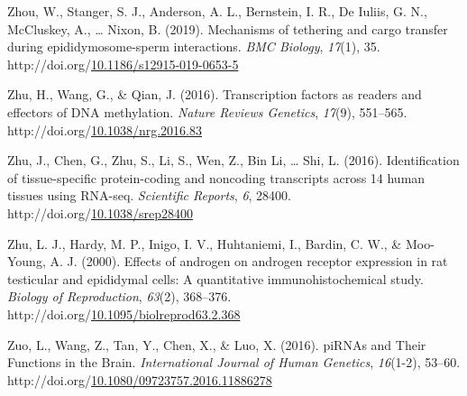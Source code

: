 \documentclass[12pt,twoside]{reedthesis}
\newlength{\cslhangindent}
\newenvironment{CSLReferences}[2] %
 {%
  \setlength{\parindent}{0pt}
  \ifodd #1 \everypar{\setlength{\hangindent}{\cslhangindent}}\ignorespaces\fi
  \ifnum #2 > 0
  \setlength{\parskip}{#2\baselineskip}
  \fi
 }%
 {}
\begin{document}
\begin{CSLReferences}{1}{0}
\leavevmode{}%
Zhou, W., Stanger, S. J., Anderson, A. L., Bernstein, I. R., De Iuliis, G. N., McCluskey, A., \ldots{} Nixon, B. (2019). Mechanisms of tethering and cargo transfer during epididymosome-sperm interactions. \emph{{BMC} Biology}, \emph{17}(1), 35. http://doi.org/\href{https://doi.org/10.1186/s12915-019-0653-5}{10.1186/s12915-019-0653-5}

\leavevmode{}%
Zhu, H., Wang, G., \& Qian, J. (2016). Transcription factors as readers and effectors of DNA methylation. \emph{Nature Reviews Genetics}, \emph{17}(9), 551--565. http://doi.org/\href{https://doi.org/10.1038/nrg.2016.83}{10.1038/nrg.2016.83}

\leavevmode{}%
Zhu, J., Chen, G., Zhu, S., Li, S., Wen, Z., Bin Li, \ldots{} Shi, L. (2016). Identification of tissue-specific protein-coding and noncoding transcripts across 14 human tissues using RNA-seq. \emph{Scientific Reports}, \emph{6}, 28400. http://doi.org/\href{https://doi.org/10.1038/srep28400}{10.1038/srep28400}

\leavevmode{}%
Zhu, L. J., Hardy, M. P., Inigo, I. V., Huhtaniemi, I., Bardin, C. W., \& Moo-Young, A. J. (2000). Effects of androgen on androgen receptor expression in rat testicular and epididymal cells: A quantitative immunohistochemical study. \emph{Biology of Reproduction}, \emph{63}(2), 368--376. http://doi.org/\href{https://doi.org/10.1095/biolreprod63.2.368}{10.1095/biolreprod63.2.368}

\leavevmode{}%
Zuo, L., Wang, Z., Tan, Y., Chen, X., \& Luo, X. (2016). piRNAs and Their Functions in the Brain. \emph{International Journal of Human Genetics}, \emph{16}(1-2), 53--60. http://doi.org/\href{https://doi.org/10.1080/09723757.2016.11886278}{10.1080/09723757.2016.11886278}

\end{CSLReferences}

\end{document}
